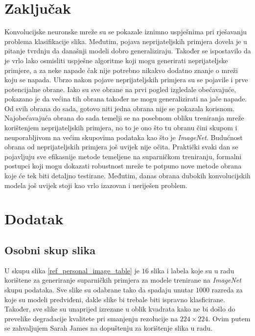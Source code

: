 \documentclass[utf8, diplomski]{fer}
\begin{document}
\chapter{Zaključak}
Konvolucijske neuronske mreže su se pokazale iznimno uspješnima pri rješavanju problema klasifikacije slika. Međutim, pojava neprijateljskih primjera dovela je u pitanje tvrdnju da današnji modeli dobro generaliziraju. Također se ispostavilo da je vrlo lako osmisliti uspješne algoritme koji mogu generirati neprijateljske primjere, a za neke napade čak nije potrebno nikakvo dodatno znanje o mreži koju se napada. Ubrzo nakon pojave neprijateljskih primjera su se pojavile i prve potencijalne obrane. Iako su sve obrane na prvi pogled izgledale obećavajuće, pokazano je da većina tih obrana također ne mogu generalizirati na jače napade. Od svih obrana do sada, gotovo niti jedna obrana nije se pokazala korisnom. Najobećavajuća obrana do sada temelji se na posebnom obliku treniranja mreže korištenjem neprijateljskih primjera, no to je ono što tu obranu čini skupom i neuporabljivom na većim skupovima podataka kao što je \textit{ImageNet}. Budućnost obrana od neprijateljskih primjera još uvijek nije očita. Praktički svaki dan se pojavljuju sve efikasnije metode temeljene na suparničkom treniranju, formalni postupci koji mogu dokazati robustnost mreže te potpuno nove metode obrana koje će tek biti detaljno testirane. Međutim, danas obrana dubokih konvolucijskih modela još uvijek stoji kao vrlo izazovan i neriješen problem.





\chapter{Dodatak}\label{dodatak}
\section{Osobni skup slika}\label{osobni_skup}
U skupu slika \ref{ref_personal_image_table} je $16$ slika i labela koje su u radu korištene za generiranje suparničkih primjera za modele trenirane na \textit{ImageNet} skupu podataka. Sve slike su odabrane tako da spadaju unutar $1000$ razreda za koje su modeli predviđeni, dakle slike bi trebale biti ispravno klasficirane. Također, sve slike su unaprijed izrezane u oblik kvadrata kako ne bi došlo do prevelike degradacije kvalitete pri smanjenju rezolucije na $224\times224$. Ovim putem se zahvaljujem Sarah James na dopuštenju za korištenje slika u radu.
\end{document}
